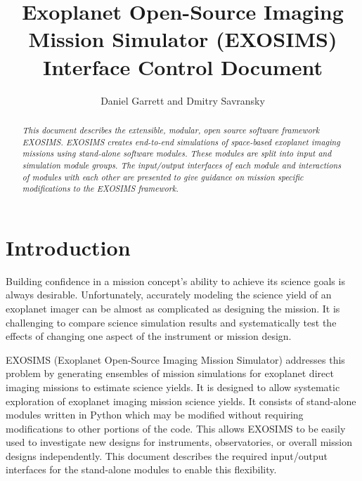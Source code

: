 \documentclass[cleanfoot]{asme2ej}
\title{Exoplanet Open-Source Imaging Mission Simulator (EXOSIMS) \\ Interface Control Document}
\author{Daniel Garrett and Dmitry Savransky
    \affiliation{
    Sibley School of Mechanical and Aerospace Engineering\\
	Cornell University\\
	Ithaca, NY 14853
    }	
}
\begin{document}
\maketitle    

\begin{abstract}
{\it This document describes the extensible, modular, open source software framework EXOSIMS.  EXOSIMS creates end-to-end simulations of space-based exoplanet imaging missions using stand-alone software modules.  These modules are split into input and simulation module groups.  The input/output interfaces of each module and interactions of modules with each other are presented to give guidance on mission specific modifications to the EXOSIMS framework.}
\end{abstract}

\tableofcontents

\begin{nomenclature}
\end{nomenclature}


\section{Introduction} 
Building confidence in a mission concept's ability to achieve its science goals is always desirable.  Unfortunately, accurately modeling the science yield of an exoplanet imager can be almost as complicated as designing the mission.  It is challenging to compare science simulation results and systematically test the effects of changing one aspect of the instrument or mission design.

EXOSIMS (Exoplanet Open-Source Imaging Mission Simulator) addresses this problem by generating ensembles of mission simulations for exoplanet direct imaging missions to estimate science yields. It is designed to allow systematic exploration of exoplanet imaging mission science yields.  It consists of stand-alone modules written in Python which may be modified without requiring modifications to other portions of the code. This allows EXOSIMS to be easily used to investigate new designs for instruments, observatories, or overall mission designs independently. This document describes the required input/output interfaces for the stand-alone modules to enable this flexibility.
\end{document}
